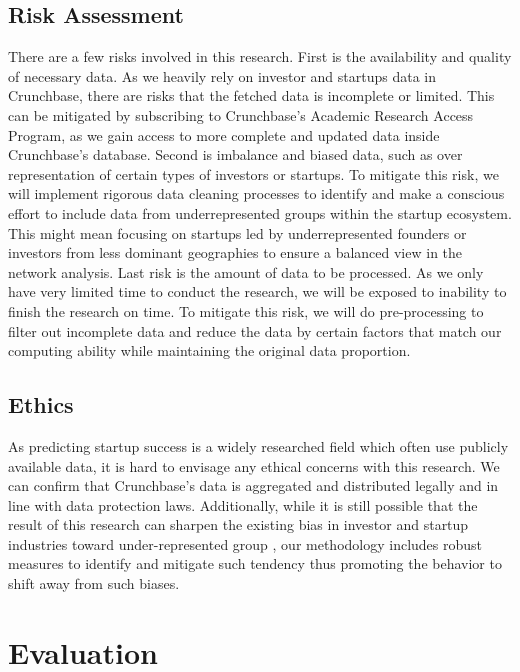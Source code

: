 \documentclass[a4paper,11pt]{article}
\begin{document}
\subsection{Risk Assessment}
There are a few risks involved in this research. First is the availability and quality of necessary data. As we heavily rely on investor and startups data in Crunchbase, there are risks that the fetched data is incomplete or limited. This can be mitigated by subscribing to Crunchbase's Academic Research Access Program, as we gain access to more complete and updated data inside Crunchbase's database. Second is imbalance and biased data, such as over representation of certain types of investors or startups. To mitigate this risk, we will implement rigorous data cleaning processes to identify and make a conscious effort to include data from underrepresented groups within the startup ecosystem. This might mean focusing on startups led by underrepresented founders or investors from less dominant geographies to ensure a balanced view in the network analysis. Last risk is the amount of data to be processed. As we only have very limited time to conduct the research, we will be exposed to inability to finish the research on time. To mitigate this risk, we will do pre-processing to filter out incomplete data and reduce the data by certain factors that match our computing ability while maintaining the original data proportion.

\subsection{Ethics}
As predicting startup success is a widely researched field which often use publicly available data, it is hard to envisage any ethical concerns with this research. We can confirm that Crunchbase's data is aggregated and distributed legally and in line with data protection laws. Additionally, while it is still possible that the result of this research can sharpen the existing bias in investor and startup industries toward under-represented group \cite{ewens2020a} \cite{cumming2007a}, our methodology includes robust measures to identify and mitigate such tendency thus promoting the behavior to shift away from such biases.


\section{Evaluation}
\end{document}
